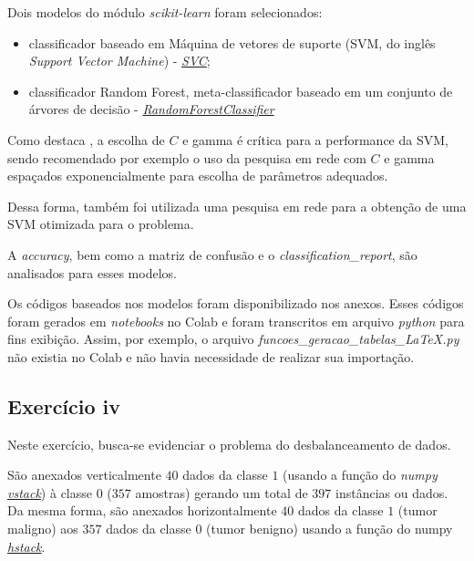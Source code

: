 Dois modelos do módulo \textit{scikit-learn} foram selecionados:
\begin{itemize}
    \item classificador baseado em  Máquina de vetores de suporte (SVM, do inglês \textit{Support Vector Machine}) -  \href{https://scikit-learn.org/stable/modules/generated/sklearn.svm.SVC.html#sklearn-svm-svc}{\textit{SVC}};
    \item classificador Random Forest, meta-classificador baseado em um conjunto de árvores de decisão - \href{https://scikit-learn.org/stable/modules/generated/sklearn.ensemble.RandomForestClassifier.html}{\textit{RandomForestClassifier}}
\end{itemize}

Como destaca \citet{scikit-learn-svn}, a escolha de $C$ e gamma é crítica para a performance da SVM, sendo recomendado por exemplo o uso da pesquisa em rede com $C$ e gamma espaçados exponencialmente para escolha de parâmetros adequados.

Dessa forma, também foi utilizada uma pesquisa em rede para a obtenção de uma SVM otimizada para o problema.

A \textit{accuracy}, bem como a  matriz de confusão  e o \textit{classification\_report}, são analisados para esses modelos.

Os códigos baseados nos modelos foram disponibilizado nos anexos. Esses códigos foram gerados em \textit{notebooks} no Colab e foram transcritos em arquivo \textit{python} para fins exibição. Assim, por exemplo, o arquivo \textit{funcoes\_geracao\_tabelas\_LaTeX.py} não existia no Colab e não havia necessidade de realizar sua importação.

\subsection{Exercício iv}

Neste exercício, busca-se evidenciar o problema do desbalanceamento de dados.

São anexados verticalmente $40$ dados da classe $1$ (usando a função do \textit{numpy} \href{https://numpy.org/doc/stable/reference/generated/numpy.vstack.html}{\textit{vstack}}) à classe $0$ ($357$ amostras) gerando um total de $397$ instâncias ou dados. Da mesma forma, são anexados horizontalmente $40$ dados da classe $1$ (tumor maligno) aos $357$ dados da classe $0$ (tumor benigno) usando a função do numpy \href{https://numpy.org/doc/stable/reference/generated/numpy.hstack.html}{\textit{hstack}}.

